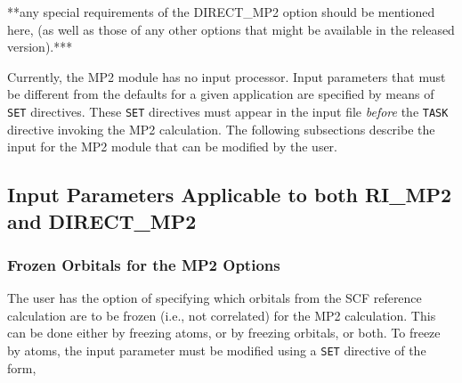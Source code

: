 \Large
**any special requirements of the DIRECT\_MP2 option should be mentioned
here, (as well as those of any other options that might be available in
the released version).***
\normalsize


Currently, the MP2 module has no input processor.  Input parameters that 
must be different from the defaults for a given application are specified
by means of \verb+SET+ directives.  These \verb+SET+ directives must appear
in the input file {\em before} the \verb+TASK+ directive invoking the
MP2 calculation.  The following subsections describe the input for the
MP2 module that can be modified by the user.

\subsection{Input Parameters Applicable to both RI\_MP2 and DIRECT\_MP2}

\subsubsection{Frozen Orbitals for the MP2 Options}

The user has the option of specifying which orbitals from the SCF reference
calculation are to be frozen (i.e., not correlated) for the MP2 calculation.
This can be done either by freezing atoms, or by freezing orbitals, or
both.  To freeze by atoms, the input parameter must be modified using a 
\verb+SET+ directive of the form,

